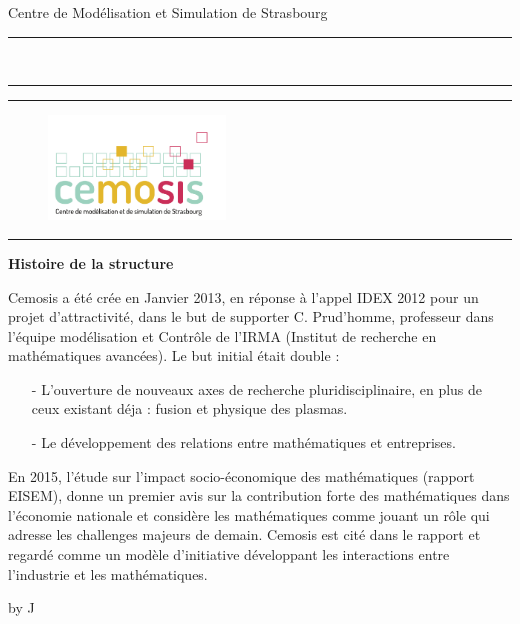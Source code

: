 \documentclass[10pt,a4paper]{article}
\newcommand{\HorRule}[1]{\noindent\rule{\linewidth}{#1}} %
\newcommand{\SepRule}{\noindent							 %
						\begin{center}
							\rule{250pt}{1pt}
						\end{center}
						}
\newcommand{\JournalName}[1]{%
		\begin{center}	
			\Huge 
			#1%
		\end{center}	
		\par \normalsize \normalfont}
\newcommand{\NewsItem}[1]{%
			
		\large \bfseries #1 \vspace{4pt}
		\par \normalsize \normalfont}
\newcommand{\NewsAuthor}[1]{%
			\hfill by \textsc{#1} \vspace{4pt}
			\par \normalfont}
\begin{document}

\JournalName{Centre de Mod\'elisation et Simulation de Strasbourg}
\noindent\HorRule{3pt} \\[-0.75\baselineskip]
\HorRule{1pt}

\vspace{0.5cm}
	\SepRule
\vspace{0.5cm}
\begin{figure}[h]

\begin{center}


		\includegraphics[width=0.42\textwidth]{images/cemosis}
		\\	%


\end{center}
\end{figure}


\vspace{0.5cm}
	\SepRule
\vspace{0.5cm}
\begin{multicols}{3}
	\NewsItem{Histoire de la structure}
 Cemosis a \'et\'e crée en Janvier 2013, en réponse à l'appel IDEX 2012 pour un projet d'attractivité, dans le but de supporter C. Prud'homme, professeur dans l'équipe modélisation et Contrôle de l'IRMA (Institut de recherche en mathématiques avancées). Le but initial était double : 
 \begin{itemize}
 	\item[-] L'ouverture de nouveaux axes de recherche pluridisciplinaire, en plus de ceux existant déja : fusion et physique des plasmas.
 	\item[-] Le développement des relations entre mathématiques et entreprises.
 \end{itemize}
 
 En 2015, l'étude sur l'impact socio-économique des mathématiques (rapport EISEM), donne un premier avis sur la contribution forte des mathématiques dans l'économie nationale et considère les mathématiques comme jouant un rôle qui adresse les challenges majeurs de demain. Cemosis est cité dans le rapport et regardé comme un modèle d'initiative développant les interactions entre l'industrie et les mathématiques.
 

\vspace{1cm}
\NewsItem{}
\NewsAuthor{J}
\end{multicols}
\end{document}
